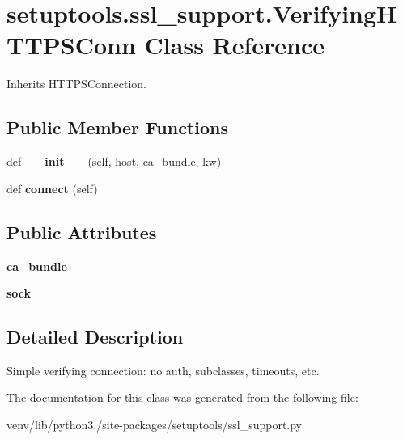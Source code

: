 \hypertarget{classsetuptools_1_1ssl__support_1_1_verifying_h_t_t_p_s_conn}{}\section{setuptools.\+ssl\+\_\+support.\+Verifying\+H\+T\+T\+P\+S\+Conn Class Reference}
\label{classsetuptools_1_1ssl__support_1_1_verifying_h_t_t_p_s_conn}


Inherits H\+T\+T\+P\+S\+Connection.

\subsection*{Public Member Functions}
\begin{DoxyCompactItemize}
\item 
\mbox{\label{classsetuptools_1_1ssl__support_1_1_verifying_h_t_t_p_s_conn_ab9587f4f980ced9d15b829afe97eeed6}} 
def {\bfseries \+\_\+\+\_\+init\+\_\+\+\_\+} (self, host, ca\+\_\+bundle, kw)
\item 
\mbox{\label{classsetuptools_1_1ssl__support_1_1_verifying_h_t_t_p_s_conn_ae94eaf957f5f53affea22841e03c703b}} 
def {\bfseries connect} (self)
\end{DoxyCompactItemize}
\subsection*{Public Attributes}
\begin{DoxyCompactItemize}
\item 
\mbox{\label{classsetuptools_1_1ssl__support_1_1_verifying_h_t_t_p_s_conn_ae2821bf00c5c65578971e64777ebe05a}} 
{\bfseries ca\+\_\+bundle}
\item 
\mbox{\label{classsetuptools_1_1ssl__support_1_1_verifying_h_t_t_p_s_conn_a926c771230a413e8dfbd9a76c590ca18}} 
{\bfseries sock}
\end{DoxyCompactItemize}


\subsection{Detailed Description}
\begin{DoxyVerb}Simple verifying connection: no auth, subclasses, timeouts, etc.\end{DoxyVerb}
 

The documentation for this class was generated from the following file\+:\begin{DoxyCompactItemize}
\item 
venv/lib/python3./site-\/packages/setuptools/ssl\+\_\+support.\+py\end{DoxyCompactItemize}
